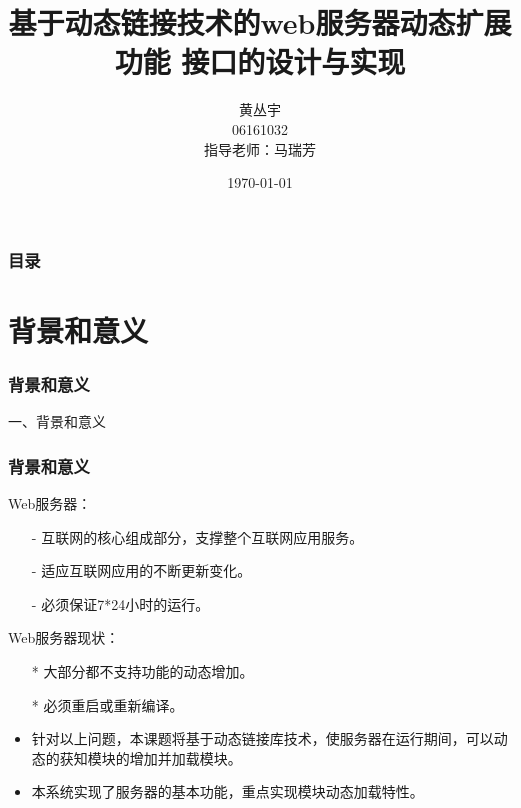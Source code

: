 \documentclass[10pt,dvipdfm]{beamer}
\begin{document}
\title[毕业设计答辩]{\Large{
			基于动态链接技术的web服务器动态扩展功能
				接口的设计与实现
	}}
\author[黄丛宇]{黄丛宇\\06161032\\指导老师：马瑞芳}
\date{\today}

\begin{frame}	
	\titlepage
\end{frame}

\begin{frame}
	\frametitle{目录}
	\tableofcontents
\end{frame}

\section{背景和意义}

\begin{frame}
	\frametitle{背景和意义}
	\begin{center}
	{\Large
		一、背景和意义
	}
	\end{center}
\end{frame}

\begin{frame}
	\frametitle{背景和意义}
	\begin{block}{Web服务器：}
		\begin{itemize}
			\item[-] 互联网的核心组成部分，支撑整个互联网应用服务。
			\item[-] 适应互联网应用的不断更新变化。
			\item[-] 必须保证7*24小时的运行。
		\end{itemize}
	\end{block}
	
	\pause
	
	\begin{block}{Web服务器现状：}
		\begin{itemize}
			\item[*] 大部分都不支持功能的动态增加。
			\item[*] 必须重启或重新编译。
		\end{itemize}
	\end{block}
	\pause
	\begin{block}{}
	\begin{itemize}
		\item 针对以上问题，本课题将基于动态链接库技术，使服务器在运行期间，可以动态的获知模块的增加并加载模块。
		\item 本系统实现了服务器的基本功能，重点实现模块动态加载特性。
	\end{itemize}
	\end{block}
\end{frame}
\end{document}
